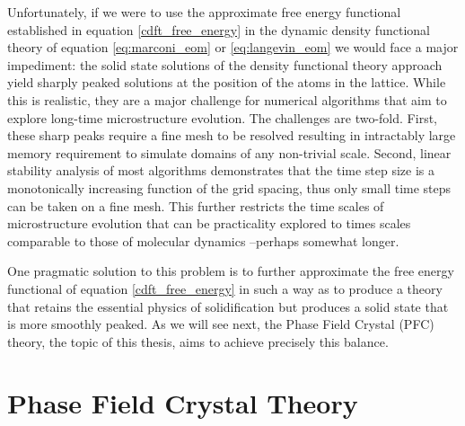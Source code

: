 Unfortunately, if we were to use the approximate free energy functional
established in equation \ref{cdft_free_energy} in the dynamic density
functional theory of equation \ref{eq:marconi_eom} or \ref{eq:langevin_eom} we
would face a major impediment: the solid state solutions of the density
functional theory approach yield sharply peaked solutions at the position of
the atoms in the lattice. While this is realistic, they are a major challenge
for numerical algorithms that aim to explore long-time microstructure
evolution.  The challenges are two-fold. First, these sharp peaks require a
fine mesh to be resolved resulting in intractably large memory requirement to
simulate domains of any non-trivial scale. Second, linear stability analysis of
most algorithms demonstrates that the time step size is a monotonically
increasing function of the grid spacing, thus only small time steps can be
taken on a fine mesh. This further restricts the time scales of microstructure
evolution that can be practicality explored to times scales comparable to those
of molecular dynamics --perhaps somewhat longer.

One pragmatic solution to this problem is to further approximate the free
energy functional of equation \ref{cdft_free_energy} in such a way as to
produce a theory that retains the essential physics of solidification but
produces a solid state that is more smoothly peaked. As we will see next, the
Phase Field Crystal (PFC) theory, the topic of this thesis, aims to achieve
precisely this balance.

\section{Phase Field Crystal Theory} %

